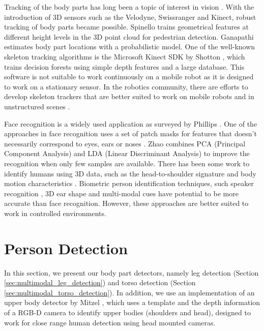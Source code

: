 Tracking of the body parts has long been a topic of interest in vision \cite{baumberg1997learning,sidenbladh2000stochastic}. With the introduction of 3D sensors such as the Velodyne, Swissranger and Kinect, robust tracking of body parts became possible. Spinello \cite{spinello2010layered} trains geometrical features at different height levels in the 3D point cloud for pedestrian detection. Ganapathi \cite{ganapathi2010real} estimates body part locations with a probabilistic model. One of the well-known skeleton tracking algorithms is the Microsoft Kinect SDK by Shotton \cite{shotton2013real}, which trains decision forests using simple depth features and a large database. This software is not suitable to work continuously on a mobile robot as it is designed to work on a stationary sensor. In the robotics community, there are efforts to develop skeleton trackers that are better suited to work on mobile robots and in unstructured scenes \cite{buys2013adaptable}.

Face recognition is a widely used application as surveyed by Phillips \cite{phillips2005overview}. One of the approaches in face recognition uses a set of patch masks for features that doesn't necessarily correspond to eyes, ears or noses \cite{turk1991face}. Zhao \cite{zhao1998discriminant} combines PCA (Principal Component Analysis) and LDA (Linear Discriminant Analysis) to improve the recognition when only few samples are available. There has been some work to identify humans using 3D data, such as the head-to-shoulder signature \cite{kirchner2012head} and body motion characteristics \cite{munsell2012person}. Biometric person identification techniques, such speaker recognition \cite{kinnunen2010overview}, 3D ear shape \cite{yan2007biometric} and multi-modal cues \cite{garcia2003biomet} have potential to be more accurate than face recognition. However, these approaches are better suited to work in controlled environments.

\section{Person Detection}
\label{sec:multimodal_person_detection}

In this section, we present our body part detectors, namely leg detection (Section \ref{sec:multimodal_leg_detection}) and torso detection (Section \ref{sec:multimodal_torso_detection}). In addition, we use an implementation of an upper body detector by Mitzel \cite{mitzel2012close}, which uses a template and the depth information of a RGB-D camera to identify upper bodies (shoulders and head), designed to work for close range human detection using head mounted cameras.

